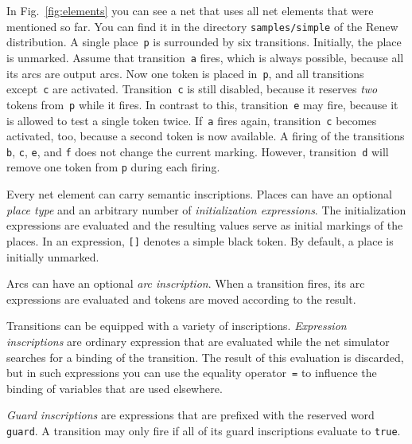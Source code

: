 In Fig.~\ref{fig:elements} you can see a net that uses all
net elements that were mentioned so far. You can find it in
the directory \texttt{samples/simple} of the Renew distribution.
A single place~\texttt{p}
is surrounded by six transitions. Initially, the place is unmarked.
Assume that transition~\texttt{a} fires, which is always
possible, because all its arcs are output arcs. Now one token
is placed in~\texttt{p}, and all transitions except~\texttt{c} are
activated. Transition~\texttt{c} is still disabled, because it reserves
\emph{two} tokens from~\texttt{p} while it fires. In contrast to this,
transition~\texttt{e} may fire, because it is allowed to test
a single token twice.
If~\texttt{a} fires again, transition~\texttt{c} becomes activated,
too, because a second token is now available. A firing of
the transitions \texttt{b}, \texttt{c}, \texttt{e}, and \texttt{f}
does not change the current marking. However, transition~\texttt{d}
will remove one token from \texttt{p} during each firing.

Every net element can carry semantic inscriptions.
Places can have an optional \emph{place type} and an arbitrary number of
\emph{initialization expressions}. The initialization expressions are
evaluated and the resulting values serve as initial markings
of the places. In an expression, \texttt{[]} denotes a simple black token.
By default, a place is initially unmarked.

Arcs can have an optional \emph{arc inscription}. When a transition
fires, its arc expressions are evaluated and tokens are moved
according to the result.

Transitions can be equipped with a variety of inscriptions.
\emph{Expression inscriptions} are ordinary expression that are evaluated
while the net simulator searches for a binding of the transition.
The result of this evaluation is discarded, but in such expressions
you can use the equality operator~\texttt{=} to influence the binding
of variables that are used elsewhere.

\emph{Guard inscriptions} are expressions that are prefixed with the reserved
word \texttt{guard}. A transition may only fire if all of its
guard inscriptions evaluate to \texttt{true}.


